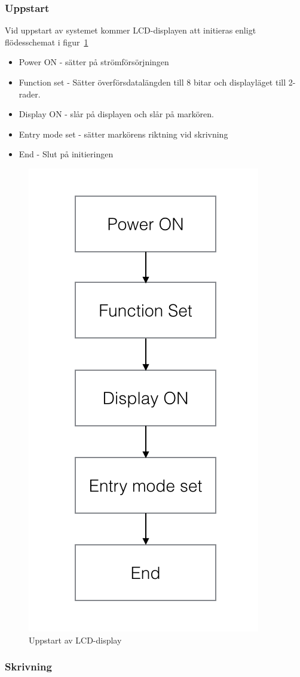 \documentclass[a4paper,12pt,fleqn]{article}
\begin{document}
\subsubsection{Uppstart}
	
Vid uppstart av systemet kommer LCD-displayen att initieras enligt flödes\-schemat i figur~\ref{fig:flowlcdstart}

\begin{itemize}
  \item Power ON - sätter på strömförsörjningen
  \item Function set - Sätter överförsdatalängden till 8 bitar och displayläget till 2-rader.
  \item Display ON - slår på displayen och slår på markören. 
  \item Entry mode set - sätter markörens riktning vid skrivning
  \item End - Slut på initieringen
\end{itemize}

\begin{figure}[htp]
	  \begin{center}
	  \includegraphics[keepaspectratio=true,width=0.4\linewidth]{bilder/startup}  %
	  \end{center}
	  \caption{Uppstart av LCD-display} %
	  \label{fig:flowlcdstart}
	\end{figure}

\newpage


\subsubsection{Skrivning}
\end{document}

